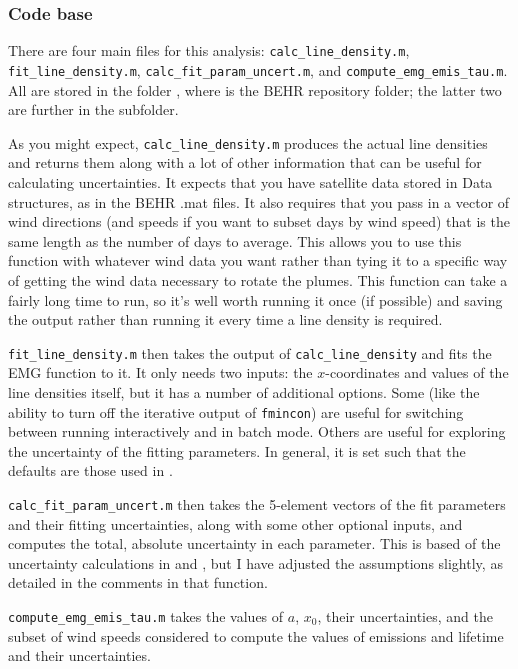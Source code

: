 \documentclass[12pt]{article}
\begin{document}
		\subsubsection{Code base}
		There are four main files for this analysis: \lstinline$calc_line_density.m$, \lstinline$fit_line_density.m$, \lstinline$calc_fit_param_uncert.m$, and \lstinline$compute_emg_emis_tau.m$.  All are stored in the folder , where  is the BEHR repository folder; the latter two are further in the  subfolder.
		
		As you might expect, \lstinline$calc_line_density.m$ produces the actual line densities and returns them along with a lot of other information that can be useful for calculating uncertainties. It expects that you have satellite data stored in Data structures, as in the BEHR .mat files. It also requires that you pass in a vector of wind directions (and speeds if you want to subset days by wind speed) that is the same length as the number of days to average. This allows you to use this function with whatever wind data you want rather than tying it to a specific way of getting the wind data necessary to rotate the plumes. This function can take a fairly long time to run, so it's well worth running it once (if possible) and saving the output rather than running it every time a line density is required.
		
		\lstinline$fit_line_density.m$ then takes the output of \lstinline$calc_line_density$ and fits the EMG function to it. It only needs two inputs: the $x$-coordinates and values of the line densities itself, but it has a number of additional options. Some (like the ability to turn off the iterative output of \lstinline$fmincon$) are useful for switching between running interactively and in batch mode. Others are useful for exploring the uncertainty of the fitting parameters. In general, it is set such that the defaults are those used in \citet{laughner16}.
		
		\lstinline$calc_fit_param_uncert.m$ then takes the 5-element vectors of the fit parameters and their fitting uncertainties, along with some other optional inputs, and computes the total, absolute uncertainty in each parameter. This is based of the uncertainty calculations in \citet{beirle11} and \citet{lu15}, but I have adjusted the assumptions slightly, as detailed in the comments in that function.
		
		\lstinline$compute_emg_emis_tau.m$ takes the values of $a$, $x_0$, their uncertainties, and the subset of wind speeds considered to compute the values of emissions and lifetime and their uncertainties.
		
\end{document}
